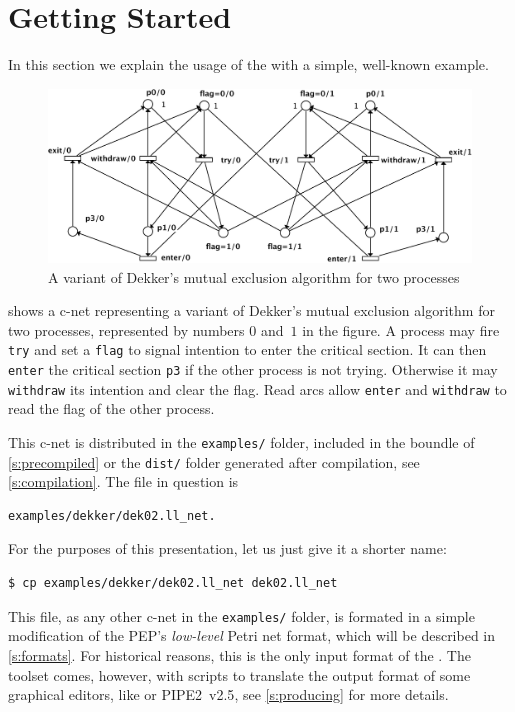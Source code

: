 \documentclass[a4paper]{refart}
\begin{document}
\section{Getting Started}%
\label{s:getting}

In this section
we explain the usage of the \cunft{} with a simple, well-known example.

\begin{figure}[h]
\centering
\includegraphics[scale=0.50]{fig/dekker2.pdf}
\caption{A variant of Dekker's mutual exclusion algorithm for two processes}
\label{f:dekker}
\end{figure}

 shows a c-net representing a variant of Dekker's mutual
exclusion algorithm for two processes, represented by numbers $0$ and~$1$
in the figure.
A process may fire \verb!try! and set a
\verb!flag! to signal intention to enter the critical section. 
It can then \verb!enter! the critical section \verb!p3!
if the other process is not trying.
Otherwise it may \verb!withdraw! its intention and clear the flag.  Read arcs
allow \verb!enter! and \verb!withdraw! to read the flag of the other process.

This c-net is distributed in the \verb!examples/! folder, included in the
boundle of \cref{s:precompiled} or the \verb!dist/! folder generated after
compilation, see \cref{s:compilation}.
The file in question is
\begin{verbatim}
examples/dekker/dek02.ll_net.
\end{verbatim}
For the purposes of this presentation, let us just give it a shorter name:
\begin{verbatim}
$ cp examples/dekker/dek02.ll_net dek02.ll_net
\end{verbatim}
This file, as any other c-net in the \verb!examples/! folder, is formated
in a simple modification of the PEP's \emph{low-level} Petri net
format, which will be described in \cref{s:formats}.
For historical reasons, this is the only input format of the \cunft{}.
The toolset comes, however, with
scripts to translate the output format of some graphical editors, like
\coloane\cite{Coloane} or PIPE2~v2.5\cite{BPK07}, see
\cref{s:producing} for more details.
\end{document}
